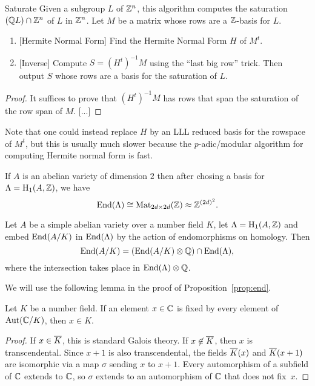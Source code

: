\documentclass{article}
\begin{document}
\begin{algorithm}{Saturate}
	Given a subgroup $L$ of $\mathbb{Z}^n$, this algorithm computes
	the saturation $(\mathbb{Q} L) \cap \mathbb{Z}^n$ of $L$ in $\mathbb{Z}^n$.
	Let $M$ be a matrix whose rows are a $\mathbb{Z}$-basis for $L$.

	\begin{enumerate}
		\item{} [Hermite Normal Form] Find the Hermite Normal Form $H$ of $M^t$.
		\item{} [Inverse] Compute $S = (H^t)^{-1} M$ using the ``last big row'' trick.
		      Then output $S$ whose rows are a basis for the saturation of $L$.
	\end{enumerate}
\end{algorithm}
\begin{proof}
	It suffices to prove that $(H^t)^{-1}M$ has rows that span the
	saturation of the row span of $M$.
		[...]
\end{proof}

Note that one could instead replace $H$ by an LLL reduced basis for
the rowspace of $M^t$, but this is usually much slower because the
$p$-adic/modular algorithm \cite{blah} for computing Hermite normal
form is fast.


If $A$ is an abelian variety of dimension $2$ then after chosing a basis for
$\Lambda = \operatorname{H}_1(A,\mathbb{Z})$, we have
$$
	\operatorname{End}(\Lambda)\cong \operatorname{Mat}_{2d\times 2d}(\mathbb{Z}) \approx \mathbb{Z}^{(2d)^2}.
$$

\begin{proposition}\label{prop:end}
	Let $A$ be a simple abelian variety over a number field $K$,
	let $\Lambda = \operatorname{H}_1(A,\mathbb{Z})$ and
	embed $\operatorname{End}(A/K)$ in $\operatorname{End}(\Lambda)$
	by the action of endomorphisms on homology.   Then
	$$
		\operatorname{End}(A/K) = (\operatorname{End}(A/K)\otimes \mathbb{Q})\cap \operatorname{End}(\Lambda),
	$$
	where  the intersection takes place in $\operatorname{End}(\Lambda)\otimes\mathbb{Q}$.
\end{proposition}
We will use the following lemma in the proof of Proposition~\ref{prop:end}.
\begin{lemma}\label{lem:gal}
	Let $K$ be a number field.  If an element $x\in \mathbb{C}$ is fixed by
	every element of $\operatorname{Aut}(\mathbb{C}/K)$, then $x\in K$.
\end{lemma}
\begin{proof}
	If $x\in\overline{K}$, this is standard Galois theory.  If $x\not\in
		\overline{K}$, then $x$ is transcendental.  Since $x+1$ is also transcendental,
	the fields $\overline{K}(x)$ and $\overline{K}(x+1)$ are isomorphic via a map $\sigma$
	sending $x$ to $x+1$.  Every automorphism of a subfield of $\mathbb{C}$
	extends to $\mathbb{C}$, so $\sigma$ extends to an automorphism of $\mathbb{C}$
	that does not fix~$x$.
\end{proof}
\end{document}
